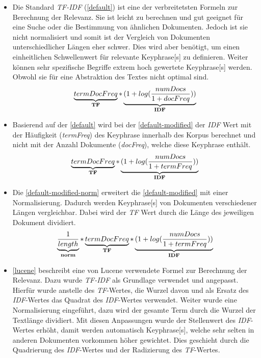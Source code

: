 \begin{itemize}
    \item Die Standard \textit{TF-IDF} (\autoref{default}) ist eine der verbreitetsten Formeln zur Berechnung der Relevanz. Sie ist leicht zu berechnen und gut geeignet für eine Suche oder die Bestimmung von ähnlichen Dokumenten. Jedoch ist sie nicht normalisiert und somit ist der Vergleich von Dokumenten unterschiedlicher Längen eher schwer. Dies wird aber benötigt, um einen einheitlichen Schwellenwert für relevante \gls{Keyphrase}[s] zu definieren. Weiter können sehr spezifische Begriffe extrem hoch gewertete \gls{Keyphrase}[s] werden. Obwohl sie für eine Abstraktion des Textes nicht optimal sind. 
    \begin{equation}\label{default}
    \underbrace{termDocFreq}_\text{\textbf{TF}} * \underbrace{ (1 +log( \frac{numDocs}{1 + docFreq}))}_\text{\textbf{IDF}}
    \end{equation}
    \item Basierend auf der \autoref{default} wird bei der \autoref{default-modified} der \textit{IDF} Wert mit der Häufigkeit (\textit{termFreq}) des \gls{Keyphrase} innerhalb des Korpus berechnet und nicht mit der Anzahl Dokumente (\textit{docFreq}), welche diese \gls{Keyphrase} enthält. 
    \begin{equation}\label{default-modified}
    \underbrace{termDocFreq}_\text{\textbf{TF}} *  \underbrace{ (1 +log( \frac{numDocs}{1 + termFreq}))}_\text{\textbf{IDF}} 
    \end{equation}
    \item Die \autoref{default-modified-norm} erweitert die \autoref{default-modified} mit einer Normalisierung. Dadurch werden \gls{Keyphrase}[s] von Dokumenten verschiedener Längen vergleichbar. Dabei wird der \textit{TF} Wert durch die Länge des jeweiligen Dokument dividiert.
    \begin{equation}\label{default-modified-norm}
    \underbrace{ \frac{1}{length} }_\text{\textbf{norm}}  * \underbrace{termDocFreq}_\text{\textbf{TF}} *  \underbrace{ (1 +log( \frac{numDocs}{1 + termFreq}))}_\text{\textbf{IDF}}
    \end{equation}
    \item \autoref{lucene} beschreibt eine von \gls{Lucene} verwendete Formel zur Berechnung der Relevanz. Dazu wurde \textit{TF-IDF} als Grundlage verwendet und angepasst. Hierfür wurde anstelle des \textit{TF}-Wertes, die Wurzel davon und als Ersatz des \textit{IDF}-Wertes das Quadrat des \textit{IDF}-Wertes verwendet. Weiter wurde eine Normalisierung eingeführt, dazu wird der gesamte Term durch die Wurzel der Textlänge dividiert. Mit diesen Anpassungen wurde der Stellenwert des \textit{IDF}-Wertes erhöht, damit werden automatisch \gls{Keyphrase}[s], welche sehr selten in anderen Dokumenten vorkommen höher gewichtet. Dies geschieht durch die Quadrierung des \textit{IDF}-Wertes und der Radizierung des \textit{TF}-Wertes.

\end{itemize}
